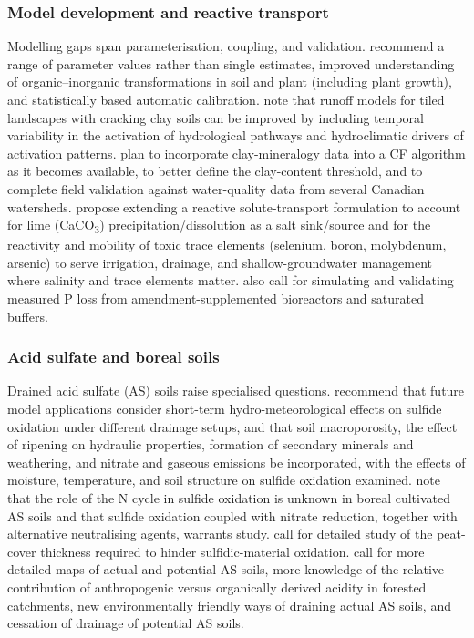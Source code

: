 \subsubsection{Model development and reactive transport}

Modelling gaps span parameterisation, coupling, and validation. \textcite{Conrad2009} recommend a range of parameter values rather than single estimates, improved understanding of organic--inorganic transformations in soil and plant (including plant growth), and statistically based automatic calibration. \textcite{Kokulan2019} note that runoff models for tiled landscapes with cracking clay soils can be improved by including temporal variability in the activation of hydrological pathways and hydroclimatic drivers of activation patterns. \textcite{Dadfar2010} plan to incorporate clay-mineralogy data into a CF algorithm as it becomes available, to better define the clay-content threshold, and to complete field validation against water-quality data from several Canadian watersheds. \textcite{KARAJEH1994c} propose extending a reactive solute-transport formulation to account for lime (CaCO\textsubscript{3}) precipitation/dissolution as a salt sink/source and for the reactivity and mobility of toxic trace elements (selenium, boron, molybdenum, arsenic) to serve irrigation, drainage, and shallow-groundwater management where salinity and trace elements matter. \textcite{Singh2020c} also call for simulating and validating measured P loss from amendment-supplemented bioreactors and saturated buffers.

\subsubsection{Acid sulfate and boreal soils}

Drained acid sulfate (AS) soils raise specialised questions. \textcite{Salo2023} recommend that future model applications consider short-term hydro-meteorological effects on sulfide oxidation under different drainage setups, and that soil macroporosity, the effect of ripening on hydraulic properties, formation of secondary minerals and weathering, and nitrate and gaseous emissions be incorporated, with the effects of moisture, temperature, and soil structure on sulfide oxidation examined. \textcite{Virtanen2017} note that the role of the N cycle in sulfide oxidation is unknown in boreal cultivated AS soils and that sulfide oxidation coupled with nitrate reduction, together with alternative neutralising agents, warrants study. \textcite{YliHalla2022} call for detailed study of the peat-cover thickness required to hinder sulfidic-material oxidation. \textcite{Åström2005} call for more detailed maps of actual and potential AS soils, more knowledge of the relative contribution of anthropogenic versus organically derived acidity in forested catchments, new environmentally friendly ways of draining actual AS soils, and cessation of drainage of potential AS soils.

